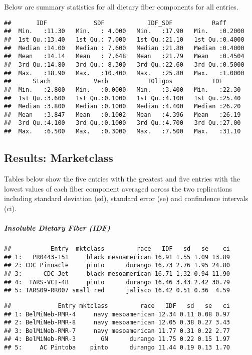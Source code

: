 \documentclass[12pt,]{article}
\begin{document}
Below are summary statistics for all dietary fiber components for all
entries.

\begin{verbatim}
##       IDF             SDF            IDF_SDF           Raff       
##  Min.   :11.30   Min.   : 4.000   Min.   :17.90   Min.   :0.2000  
##  1st Qu.:13.40   1st Qu.: 7.000   1st Qu.:21.10   1st Qu.:0.4000  
##  Median :14.00   Median : 7.600   Median :21.80   Median :0.4000  
##  Mean   :14.14   Mean   : 7.648   Mean   :21.79   Mean   :0.4504  
##  3rd Qu.:14.80   3rd Qu.: 8.300   3rd Qu.:22.60   3rd Qu.:0.5000  
##  Max.   :18.90   Max.   :10.400   Max.   :25.80   Max.   :1.0000  
##      Stach            Verb           TOligos           TDF       
##  Min.   :2.800   Min.   :0.0000   Min.   :3.400   Min.   :22.30  
##  1st Qu.:3.600   1st Qu.:0.1000   1st Qu.:4.100   1st Qu.:25.40  
##  Median :3.800   Median :0.1000   Median :4.400   Median :26.20  
##  Mean   :3.847   Mean   :0.1002   Mean   :4.396   Mean   :26.19  
##  3rd Qu.:4.100   3rd Qu.:0.1000   3rd Qu.:4.700   3rd Qu.:27.00  
##  Max.   :6.500   Max.   :0.3000   Max.   :7.500   Max.   :31.10
\end{verbatim}

\subsection{Results: Marketclass}\label{results-marketclass}

Tables below show the five entries with the greatest and five entries
with the lowest values of each fiber component averaged across the two
replications including standard deviation (sd), standard error (se) and
confindence intervals (ci).

\subparagraph{Insoluble Dietary Fiber
(IDF)}\label{insoluble-dietary-fiber-idf}

\begin{verbatim}
##           Entry  mktclass         race   IDF   sd   se    ci
## 1:   PR0443-151     black mesoamerican 16.91 1.55 1.09 13.89
## 2: CDC Pinnacle     pinto      durango 16.73 2.76 1.95 24.80
## 3:      CDC Jet     black mesoamerican 16.71 1.32 0.94 11.90
## 4:  TARS-VCI-4B     pinto      durango 16.46 3.43 2.42 30.79
## 5: TARS09-RR007 small red      jalisco 16.42 0.51 0.36  4.59
\end{verbatim}

\begin{verbatim}
##             Entry mktclass         race   IDF   sd   se   ci
## 1: BelMiNeb-RMR-4     navy mesoamerican 12.34 0.11 0.08 0.97
## 2: BelMiNeb-RMR-8     navy mesoamerican 12.05 0.38 0.27 3.43
## 3: BelMiNeb-RMR-7     navy mesoamerican 11.77 0.31 0.22 2.77
## 4: BelMiNeb-RMR-3       GN      durango 11.75 0.22 0.15 1.97
## 5:     AC Pintoba    pinto      durango 11.44 0.19 0.13 1.70
\end{verbatim}
\end{document}
